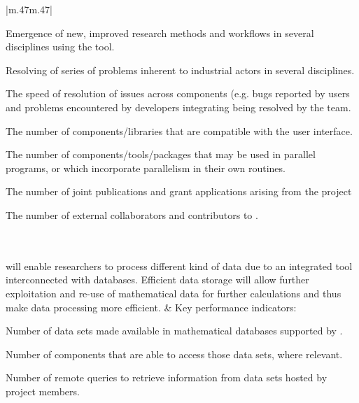 \begin{supertabular}{|m{.47\textwidth}m{.47\textwidth}|}
\begin{compactenum}
\item Emergence of new, improved research methods and workflows 
in several disciplines using the tool. %
\item Resolving of series of problems inherent to industrial actors in several disciplines.
\item The speed of resolution of issues across components (e.g. bugs 
reported by \Sage users and problems encountered by \Sage developers 
integrating \GAP being resolved by the \GAP team. 
\item The number of components/libraries that are compatible with the \TheProject user interface.
\item The number of components/tools/packages that may be used in parallel
programs, or which incorporate parallelism in their own routines.
\item The number of joint publications and grant applications arising from the project
\item The number of external collaborators and contributors to \TheProject.
\end{compactenum}
\\\hline
\hline{}\\\hline
\TheProject will enable researchers to process
different kind of  data due to an integrated tool interconnected
with databases. Efficient data storage will allow further exploitation
and  re-use of mathematical data for further calculations and thus make
data processing more efficient.
 &
Key performance indicators:
\begin{compactenum}
\item Number of data sets made available in mathematical databases supported by \TheProject.
\item Number of \TheProject components that are able to access those data sets, where relevant.
\item Number of remote queries to retrieve information from data sets hosted by project members.
\end{compactenum}
\\\hline

\hline{}\\\hline


\end{supertabular}
